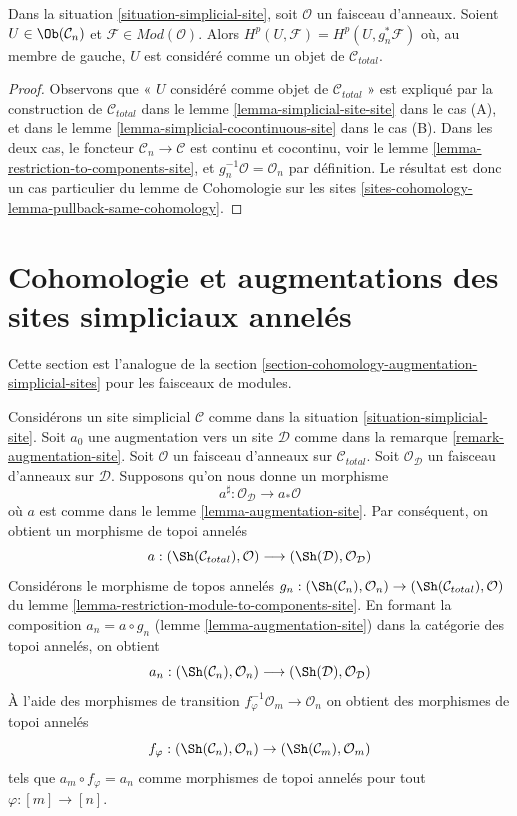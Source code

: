 \begin{lemma}
\label{lemma-sanity-check-modules}
Dans la situation \ref{situation-simplicial-site}, soit $\mathcal{O}$
un faisceau d'anneaux. Soient $U \in \Ob(\mathcal{C}_n)$ et
$\mathcal{F} \in \textit{Mod}(\mathcal{O})$.
Alors $H^p(U, \mathcal{F}) = H^p(U, g_n^*\mathcal{F})$
où, au membre de gauche, $U$ est considéré comme un objet de
$\mathcal{C}_{total}$.
\end{lemma}

\begin{proof}
Observons que « $U$ considéré comme objet de $\mathcal{C}_{total}$ »
est expliqué par la construction de $\mathcal{C}_{total}$ dans le
lemme \ref{lemma-simplicial-site-site} dans le cas (A), et dans le
lemme \ref{lemma-simplicial-cocontinuous-site} dans le cas (B).
Dans les deux cas, le foncteur $\mathcal{C}_n \to \mathcal{C}$
est continu et cocontinu, voir
le lemme \ref{lemma-restriction-to-components-site}, et
$g_n^{-1}\mathcal{O} = \mathcal{O}_n$ par définition.
Le résultat est donc un cas particulier du lemme
de Cohomologie sur les sites
\ref{sites-cohomology-lemma-pullback-same-cohomology}.
\end{proof}






\section{Cohomologie et augmentations des sites simpliciaux annelés}
\label{section-cohomology-augmentation-ringed-simplicial-sites}

\noindent
Cette section est l'analogue de
la section \ref{section-cohomology-augmentation-simplicial-sites}
pour les faisceaux de modules.

\medskip\noindent
Considérons un site simplicial $\mathcal{C}$ comme dans
la situation \ref{situation-simplicial-site}.
Soit $a_0$ une augmentation vers un site $\mathcal{D}$ comme dans
la remarque \ref{remark-augmentation-site}.
Soit $\mathcal{O}$ un faisceau d'anneaux sur $\mathcal{C}_{total}$.
Soit $\mathcal{O}_\mathcal{D}$ un faisceau d'anneaux sur $\mathcal{D}$.
Supposons qu’on nous donne un morphisme
$$
a^\sharp : \mathcal{O}_\mathcal{D} \longrightarrow a_*\mathcal{O}
$$
où $a$ est comme dans le lemme \ref{lemma-augmentation-site}.
Par conséquent, on obtient un morphisme de topoi annelés
$$
a :
(\Sh(\mathcal{C}_{total}), \mathcal{O})
\longrightarrow
(\Sh(\mathcal{D}), \mathcal{O}_\mathcal{D})
$$
Considérons le morphisme de topos annelés $g_n : (\Sh(\mathcal{C}_n), \mathcal{O}_n) \to
(\Sh(\mathcal{C}_{total}), \mathcal{O})$
du
lemme \ref{lemma-restriction-module-to-components-site}. En formant
la composition $a_n = a \circ g_n$
(lemme \ref{lemma-augmentation-site})
dans la catégorie des topoi annelés, on obtient
$$
a_n :
(\Sh(\mathcal{C}_n), \mathcal{O}_n)
\longrightarrow
(\Sh(\mathcal{D}), \mathcal{O}_\mathcal{D})
$$
À l'aide des morphismes de transition $f_\varphi^{-1}\mathcal{O}_m \to \mathcal{O}_n$
on obtient des morphismes de topoi annelés
$$
f_\varphi : (\Sh(\mathcal{C}_n), \mathcal{O}_n) \to
(\Sh(\mathcal{C}_m), \mathcal{O}_m)
$$
tels que $a_m \circ f_\varphi = a_n$ comme morphismes de topoi annelés
pour tout $\varphi : [m] \to [n]$.

